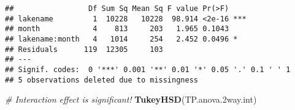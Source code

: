 \documentclass[]{article}
\newenvironment{Shaded}{\begin{snugshade}}{\end{snugshade}}
\newcommand{\CommentTok}[1]{\textcolor[rgb]{0.56,0.35,0.01}{\textit{#1}}}
\newcommand{\FloatTok}[1]{\textcolor[rgb]{0.00,0.00,0.81}{#1}}
\newcommand{\KeywordTok}[1]{\textcolor[rgb]{0.13,0.29,0.53}{\textbf{#1}}}
\newcommand{\NormalTok}[1]{#1}
\begin{document}
\begin{verbatim}
##                 Df Sum Sq Mean Sq F value Pr(>F)    
## lakename         1  10228   10228  98.914 <2e-16 ***
## month            4    813     203   1.965 0.1043    
## lakename:month   4   1014     254   2.452 0.0496 *  
## Residuals      119  12305     103                   
## ---
## Signif. codes:  0 '***' 0.001 '**' 0.01 '*' 0.05 '.' 0.1 ' ' 1
## 5 observations deleted due to missingness
\end{verbatim}

\begin{Shaded}
\begin{Highlighting}[]
\CommentTok{# Interaction effect is significant!}
\KeywordTok{TukeyHSD}\NormalTok{(TP.anova}\FloatTok{.2}\NormalTok{way.int)}
\end{Highlighting}
\end{Shaded}
\end{document}

